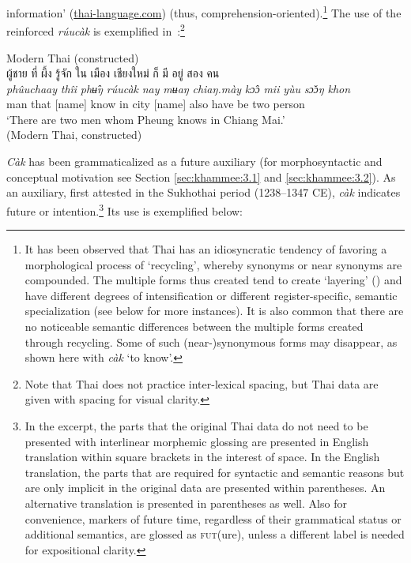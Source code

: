 \documentclass[output=paper,colorlinks,citecolor=brown]{langscibook}
\begin{document}
information’ (\href{thai-language.com}{thai-language.com}) (thus, comprehension-oriented).\footnote{It has been observed that Thai has an idiosyncratic tendency of favoring a morphological process of ‘recycling’, whereby synonyms or near synonyms are compounded. The multiple forms thus created tend to create ‘layering’ (\cite{Hopper1991}) and have different degrees of intensification or different register-specific, semantic specialization (see below for more instances). It is also common that there are no noticeable semantic differences between the multiple forms created through recycling. Some of such (near-)synonymous forms may disappear, as shown here with \textit{càk} ‘to know’.} The use of the reinforced \textit{rúucàk }is exemplified in~:\footnote{Note that Thai does not practice inter-lexical spacing, but Thai data are given with spacing for visual clarity.}


\ea \label{ex:1} Modern Thai (constructed)\\
    \textthai{ผู้ชาย} \textthai{ที่} \textthai{ผึ้ง} \textthai{รู้จัก} \textthai{ใน} \textthai{เมือง} \textthai{เชียงใหม่} \textthai{ก็} \textthai{มี} \textthai{อยู่} \textthai{สอง} \textthai{คน}\\
         \gll \textit{phûuchaay} \textit{thîi} \textit{phʉ̂ŋ} \textit{rúucàk} \textit{nay} \textit{mʉaŋ} \textit{chiaŋ.mày} \textit{kɔ̂ɔ} \textit{mii} \textit{yùu} \textit{sɔ̌ɔŋ} \textit{khon}\\
         man that [name] know in city [name] also have be two person\\
    \glt ‘There are two men whom Pheung knows in Chiang Mai.’ \\
    \hfill (Modern Thai, constructed)
\z

\textit{Càk} has been grammaticalized as a future auxiliary (for morphosyntactic and conceptual motivation see Section \ref{sec:khammee:3.1} and \ref{sec:khammee:3.2}). As an auxiliary, first attested in the Sukhothai period (1238--1347 CE), \textit{càk }indicates future or intention.\footnote{In the excerpt, the parts that the original Thai data do not need to be presented with interlinear morphemic glossing are presented in English translation within square brackets in the interest of space. In the English translation, the parts that are required for syntactic and semantic reasons but are only implicit in the original data are presented within parentheses. An alternative translation is presented in parentheses as well. Also for convenience, markers of future time, regardless of their grammatical status or additional semantics, are glossed as \textsc{fut}(ure), unless a different label is needed for expositional clarity.} Its use is exemplified below:
\end{document}
